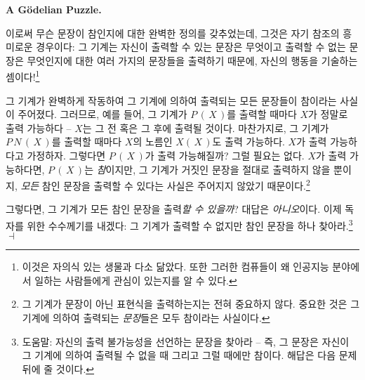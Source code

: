 \documentclass[12pt]{paper}
\newenvironment{context}[1][]
{ \noindent \textbf{{#1}.}
}
{ \hfill $ \dashv $
}
\begin{document}
\begin{context}[A G\"odelian Puzzle]
    이로써 무슨 문장이 참인지에 대한 완벽한 정의를 갖추었는데,
    그것은 자기 참조의 흥미로운 경우이다:
    그 기계는 자신이 출력할 수 있는 문장은 무엇이고 출력할 수 없는 문장은 무엇인지에 대한 여러 가지의 문장들을 출력하기 때문에,
    자신의 행동을 기술하는 셈이다!\footnote
    {
      이것은 자의식 있는 생물과 다소 닮았다.
      또한 그러한 컴퓨들이 왜 인공지능 분야에서 일하는 사람들에게 관심이 있는지를 알 수 있다.
    }

    그 기계가 완벽하게 작동하여 그 기계에 의하여 출력되는 모든 문장들이 참이라는 사실이 주어졌다.
    그러므로, 예를 들어, 그 기계가 $P \, \left( \, X \, \right)$를 출력할 때마다 $X$가 정말로 출력 가능하다 --
    $X$는 그 전 혹은 그 후에 출력될 것이다.
    마찬가지로, 그 기계가 $P \, N \, \left( \, X \, \right)$를 출력할 때마다 $X$의 노름인 $X \left( \, X \, \right)$도 출력 가능하다.
    $X$가 출력 가능하다고 가정하자.
    그렇다면 $P \, \left( \, X \, \right)$가 출력 가능해질까?
    그럴 필요는 없다.
    $X$가 출력 가능하다면, $P \, \left( \, X \, \right)$는 \textit{참}이지만,
    그 기계가 거짓인 문장을 절대로 출력하지 않을 뿐이지,
    \textit{모든} 참인 문장을 출력할 수 있다는 사실은 주어지지 않았기 때문이다.\footnote
    {
      그 기계가 문장이 아닌 표현식을 출력하는지는 전혀 중요하지 않다.
      중요한 것은 그 기계에 의하여 출력되는 \textit{문장}들은 모두 참이라는 사실이다.
    }

    그렇다면, 그 기계가 모든 참인 문장을 출력\textit{할 수 있을까}?
    대답은 \textit{아니오}이다.
    이제 독자를 위한 수수께기를 내겠다:
    그 기계가 출력할 수 없지만 참인 문장을 하나 찾아라.\footnote
    {
      도움말: 자신의 출력 불가능성을 선언하는 문장을 찾아라 --
      즉, 그 문장은 자신이 그 기계에 의하여 출력될 수 없을 때 그리고 그럴 때에만 참이다.
      해답은 다음 문제 뒤에 줄 것이다.
    }
  \end{context}
\end{document}

